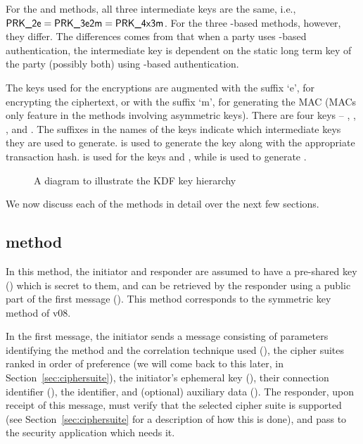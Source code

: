 {For the \mPskPsk{} and \mSigSig{} methods, all three intermediate keys
are the same, i.e., $\text{\textup{\textsf{PRK\_2e}}} = \text{\textup{\textsf{PRK\_3e2m}}} = \text{\textup{\textsf{PRK\_4x3m}}}$.
For the three \mStat-based methods, however, they differ.
The differences comes from that when a party uses \mStat{}-based authentication,
the intermediate key \mPRKthree{} is dependent on the static long term key of
the party (possibly both) using \mStat{}-based authentication.

The keys used for the \mAead{} encryptions are augmented with the suffix `e',
for encrypting the ciphertext, or with the suffix `m', for generating the MAC
(MACs only feature in the methods involving asymmetric keys). There are four
keys -- \mKtwom, \mKtwoe, \mKthreem, and \mKthreeae. The suffixes in the names
of the keys indicate which intermediate keys they are used to generate.
\mPRKtwo{} is used to generate the key \mKtwoe{} along with the appropriate
transaction hash. \mPRKthree{} is used for the keys \mKtwom{} and \mKthreeae,
while \mPRKfour{} is used to generate \mKthreem.

\begin{figure}[htp]
\centering

\caption{A diagram to illustrate the KDF key hierarchy}
\label{fig:kdfdiagram}
\end{figure}

We now discuss each of the \mEdhoc{} methods in detail over the next few sections.

\subsection{\mPskPsk{} method}
In this method, the initiator and responder are assumed to have a pre-shared key (\mPsk) which is secret to them, and can be retrieved by the responder using a public part of the first message (\mIDPsk). This method corresponds to the symmetric key method of \mEdhoc{} v08. 

In the first message, the initiator sends a message consisting of parameters
identifying the method and the correlation technique used (\mMethod), the cipher
suites ranked in order of preference (we will come back to this later, in
Section~\ref{sec:ciphersuite}), the initiator's ephemeral key (\mGx), their
connection identifier (\mCi), the \mIDPsk{} identifier, and (optional) auxiliary
data (\mADone). The responder, upon receipt of this message, must verify that
the selected cipher suite is supported (see Section~\ref{sec:ciphersuite} for a
description of how this is done),  and pass \mADone{} to the security application which needs it.

}
